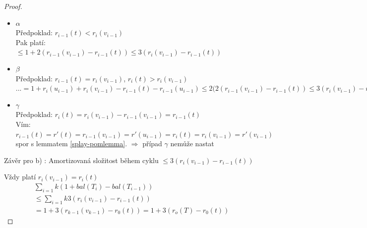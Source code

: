 \begin{proof}
\begin{itemize}
  \begin{itemize}
  \item{$\alpha$} \\
    Předpoklad: $r_{i-1}(t) < r_i(v_{i-1})$ \\
    Pak platí: \\
    $\leq 1 + 2(r_{i-1}(v_{i-1}) - r_{i-1}(t)) 
    \leq 3(r_i(v_{i-1}) - r_{i-1}(t))$
  \item{$\beta$} \\
    Předpoklad: $r_{i-1}(t) = r_i(v_{i-1})$, $r_i(t) > r_i(v_{i-1})$ \\
    $... = 1 + r_i(u_{i-1}) + r_i(v_{i-1}) - r_{i-1}(t) - r_{i-1}(u_{i-1})
    \leq 2(2(r_{i-1}(v_{i-1}) - r_{i-1}(t))
    \leq 3(r_i(v_{i-1}) - r_{i-1}(t))$
  \item{$\gamma$} \\
    Předpoklad: $r_i(t) = r_i(v_{i-1}) - r_{i-1}(v_{i-1}) = r_{i-1}(t)$ \\
    Vím: $r_{i-1}(t) = r'(t) = r_{i-1}(v_{i-1}) = r'(u_{i-1}) 
    = r_i(t) = r_i(v_{i-1}) = r'(v_{i-1})$
    spor s lemmatem \ref{splay-pomlemma}.
    $\Rightarrow$ případ $\gamma$ nemůže nastat
  \end{itemize}

  Závěr pro b) : Amortizovaná složitost během cyklu 
  $\leq 3(r_i(v_{i-1}) - r_{i-1}(t))$

\end{itemize}

Vždy platí $r_i(v_{i-1}) = r_i(t)$ \\
\begin{equation}
\begin{split}
& \sum_{i=1}{k}(1 + bal(T_i) - bal(T_{i-1})) \\
& \leq \sum_{i=1}{k} 3(r_i(v_{i-1}) - r_{i-1}(t)) \\
& = 1 + 3(r_{k-1}(v_{k-1}) - r_0(t)) = 1 + 3(r_o(T) - r_0(t))
\end{split}
\end{equation}



\end{proof}
